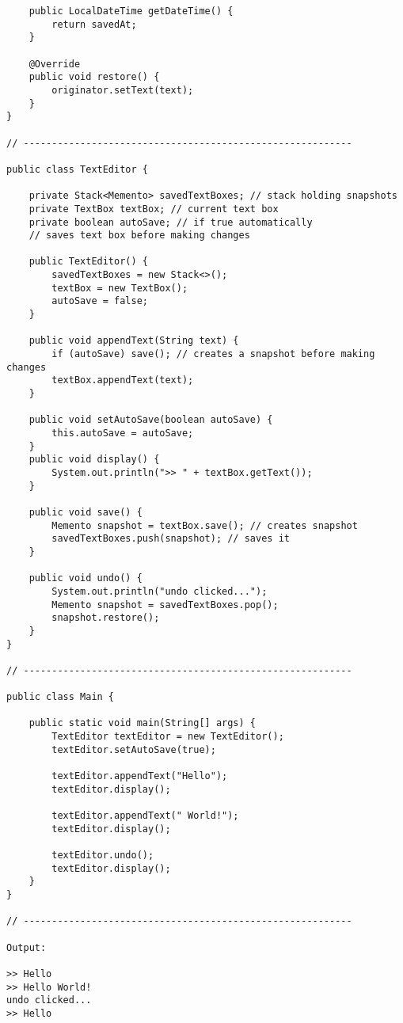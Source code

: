\begin{verbatim}
    public LocalDateTime getDateTime() {
        return savedAt;
    }

    @Override
    public void restore() {
        originator.setText(text);
    }
}

// ----------------------------------------------------------

public class TextEditor {

    private Stack<Memento> savedTextBoxes; // stack holding snapshots
    private TextBox textBox; // current text box
    private boolean autoSave; // if true automatically 
    // saves text box before making changes 

    public TextEditor() {
        savedTextBoxes = new Stack<>();
        textBox = new TextBox();
        autoSave = false;
    }

    public void appendText(String text) {
        if (autoSave) save(); // creates a snapshot before making changes
        textBox.appendText(text);
    }

    public void setAutoSave(boolean autoSave) {
        this.autoSave = autoSave;
    }
    public void display() {
        System.out.println(">> " + textBox.getText());
    }

    public void save() {
        Memento snapshot = textBox.save(); // creates snapshot
        savedTextBoxes.push(snapshot); // saves it
    }

    public void undo() {
        System.out.println("undo clicked...");
        Memento snapshot = savedTextBoxes.pop();
        snapshot.restore();
    }
}

// ----------------------------------------------------------

public class Main {

    public static void main(String[] args) {
        TextEditor textEditor = new TextEditor();
        textEditor.setAutoSave(true);

        textEditor.appendText("Hello");
        textEditor.display();
        
        textEditor.appendText(" World!");
        textEditor.display();
        
        textEditor.undo();
        textEditor.display();
    }
}

// ----------------------------------------------------------

Output:

>> Hello
>> Hello World!
undo clicked...
>> Hello
    
\end{verbatim}

